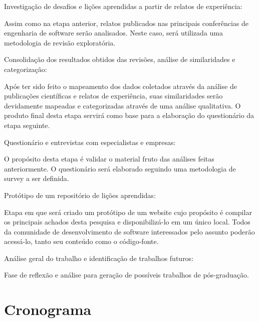 \documentclass[a4paper,11pt]{article}
\newcounter{contadorDeEtapas}
\begin{document}
\begin{list}{\bfseries{}E -~}{\bfseries}
		\item Investigação de desafios e lições aprendidas  a partir de relatos de experiência:

			\textnormal{Assim como na etapa anterior, relatos publicados nas principais conferências de engenharia de software serão analisados. Neste caso, será utilizada uma metodologia de revisão exploratória.}

		\item Consolidação dos resultados obtidos das revisões, análise de similaridades e categorização:

			\textnormal{Após ter sido feito o mapeamento dos dados coletados através da análise de publicações científicas e relatos de experiência, suas similaridades serão devidamente mapeadas e categorizadas através de uma análise qualitativa. O produto final desta etapa servirá como base para a elaboração do questionário da etapa seguinte.}

		\item Questionário e entrevistas com especialistas e empresas:

			\textnormal{O propósito desta etapa é validar o material fruto das análises feitas anteriormente. O questionário será elaborado seguindo uma metodologia de survey a ser definida.}

		\item Protótipo de um repositório de lições aprendidas:

			\textnormal{Etapa em que será criado um protótipo de um website cujo propósito é compilar os principais achados desta pesquisa e disponibilizá-lo em um único local. Todos da comunidade de desenvolvimento de software interessados pelo assunto poderão acessá-lo, tanto seu conteúdo como o código-fonte.}

		\item Análise geral do trabalho e identificação de trabalhos futuros:

			\textnormal{Fase de reflexão e análise para geração de possíveis trabalhos de pós-graduação.}

\end{list}

\section{Cronograma}
\end{document}
